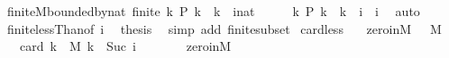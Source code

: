 \begin{isabellebody}
\endisatagproof
{\isafoldproof}%
%
\isadelimproof
\isanewline
%
\endisadelimproof
\isanewline
{}\isamarkupfalse%
\ finite{\isacharunderscore}{\kern0pt}M{\isacharunderscore}{\kern0pt}bounded{\isacharunderscore}{\kern0pt}by{\isacharunderscore}{\kern0pt}nat{\isacharcolon}{\kern0pt}\ {\isachardoublequoteopen}finite\ {\isacharbraceleft}{\kern0pt}k{\isachardot}{\kern0pt}\ P\ k\ {\isasymand}\ k\ {\isacharless}{\kern0pt}\ {\isacharparenleft}{\kern0pt}i{\isacharcolon}{\kern0pt}{\isacharcolon}{\kern0pt}nat{\isacharparenright}{\kern0pt}{\isacharbraceright}{\kern0pt}{\isachardoublequoteclose}\isanewline
%
\isadelimproof
%
\endisadelimproof
%
\isatagproof
{}\isamarkupfalse%
\ {\isacharminus}{\kern0pt}\isanewline
\ \ \isamarkupfalse%
\ {\isachardoublequoteopen}{\isacharbraceleft}{\kern0pt}k{\isachardot}{\kern0pt}\ P\ k\ {\isasymand}\ k\ {\isacharless}{\kern0pt}\ i{\isacharbraceright}{\kern0pt}\ {\isasymsubseteq}\ {\isacharbraceleft}{\kern0pt}{\isachardot}{\kern0pt}{\isachardot}{\kern0pt}{\isacharless}{\kern0pt}i{\isacharbraceright}{\kern0pt}{\isachardoublequoteclose}\ \isamarkupfalse%
\ auto\isanewline
\ \ \isamarkupfalse%
\ finite{\isacharunderscore}{\kern0pt}lessThan{\isacharbrackleft}{\kern0pt}of\ {\isachardoublequoteopen}i{\isachardoublequoteclose}{\isacharbrackright}{\kern0pt}\ \isamarkupfalse%
\ {\isacharquery}{\kern0pt}thesis\ \isamarkupfalse%
\ {\isacharparenleft}{\kern0pt}simp\ add{\isacharcolon}{\kern0pt}\ finite{\isacharunderscore}{\kern0pt}subset{\isacharparenright}{\kern0pt}\isanewline
{}\isamarkupfalse%
%
\endisatagproof
{\isafoldproof}%
%
\isadelimproof
\isanewline
%
\endisadelimproof
\isanewline
{}\isamarkupfalse%
\ card{\isacharunderscore}{\kern0pt}less{\isacharcolon}{\kern0pt}\isanewline
\ \ \ zero{\isacharunderscore}{\kern0pt}in{\isacharunderscore}{\kern0pt}M{\isacharcolon}{\kern0pt}\ {\isachardoublequoteopen}{}\ {\isasymin}\ M{\isachardoublequoteclose}\isanewline
\ \ \ {\isachardoublequoteopen}card\ {\isacharbraceleft}{\kern0pt}k\ {\isasymin}\ M{\isachardot}{\kern0pt}\ k\ {\isacharless}{\kern0pt}\ Suc\ i{\isacharbraceright}{\kern0pt}\ {\isasymnoteq}\ {}{\isachardoublequoteclose}\isanewline
%
\isadelimproof
%
\endisadelimproof
%
\isatagproof
{}\isamarkupfalse%
\ {\isacharminus}{\kern0pt}\isanewline
\ \ \isamarkupfalse%
\ zero{\isacharunderscore}{\kern0pt}in{\isacharunderscore}{\kern0pt}M\ \isamarkupfalse%

\end{isabellebody}
